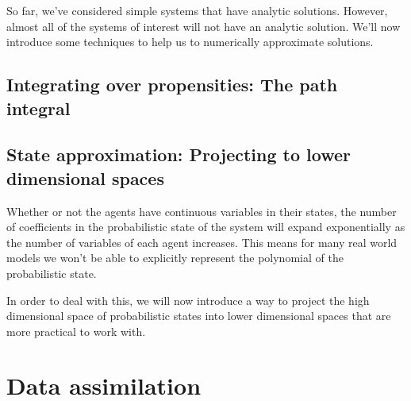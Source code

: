\documentclass[letterpaper,twocolumn,10pt]{article}
\begin{document}
So far, we've considered simple systems that have analytic solutions. However, almost all of the systems of interest will not have an analytic solution. We'll now introduce some techniques to help us to numerically approximate solutions.

\subsection{Integrating over propensities: The path integral}

\subsection{State approximation: Projecting to lower dimensional spaces}

Whether or not the agents have continuous variables in their states, the number of coefficients in the probabilistic state of the system will expand exponentially as the number of variables of each agent increases. This means for many real world models we won't be able to explicitly represent the polynomial of the probabilistic state.

In order to deal with this, we will now introduce a way to project the high dimensional space of probabilistic states into lower dimensional spaces that are more practical to work with.


\section{Data assimilation}
\end{document}
